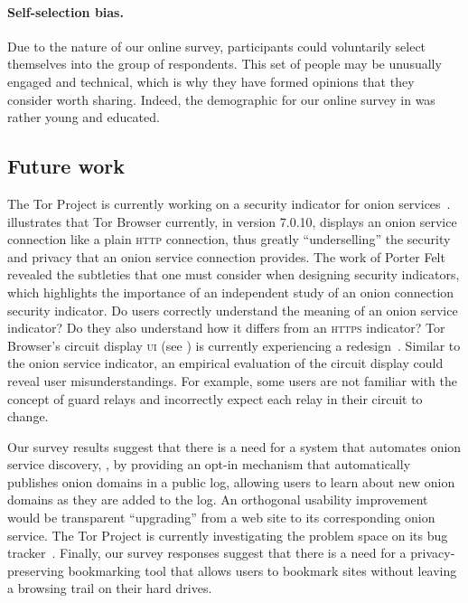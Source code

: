 \paragraph{Self-selection bias.}
Due to the nature of our online survey, participants could voluntarily select
themselves into the group of respondents.  This set of people may be unusually
engaged and technical, which is why they have formed opinions that they
consider worth sharing.  Indeed, the demographic for our online survey in
 was rather young and educated.

\subsection{Future work}
\label{sec:future-work}

The Tor Project is currently working on a security indicator for onion
services~\cite{trac23247}.   illustrates that Tor
Browser currently, in version 7.0.10, displays an onion service connection like
a plain \textsc{http} connection, thus greatly ``underselling'' the security and
privacy that an onion service connection provides.  The work of Porter Felt
\ea~\cite{Felt2016a} revealed the subtleties that one must consider when
designing security indicators, which highlights the importance of an independent
study of an onion connection security indicator.  Do users correctly understand
the meaning of an onion service indicator?  Do they also understand how it
differs from an \textsc{https} indicator?  Tor Browser's circuit display
\textsc{ui} (see ) is currently experiencing a
redesign~\cite{trac24309}.  Similar to the onion service indicator, an empirical
evaluation of the circuit display could reveal user misunderstandings.  For
example, some users are not familiar with the concept of guard relays and
incorrectly expect each relay in their circuit to change.

Our survey results suggest that there is a need for a system that automates
onion service discovery, \eg, by providing an opt-in mechanism that
automatically publishes onion domains in a public log, allowing users to learn
about new onion domains as they are added to the log.  An orthogonal usability
improvement would be transparent ``upgrading'' from a web site to its
corresponding onion service.  The Tor Project is currently investigating the
problem space on its bug tracker~\cite{trac21952}.  Finally, our survey
responses suggest that there is a need for a privacy-preserving bookmarking tool
that allows users to bookmark sites without leaving a browsing trail on their
hard drives.
